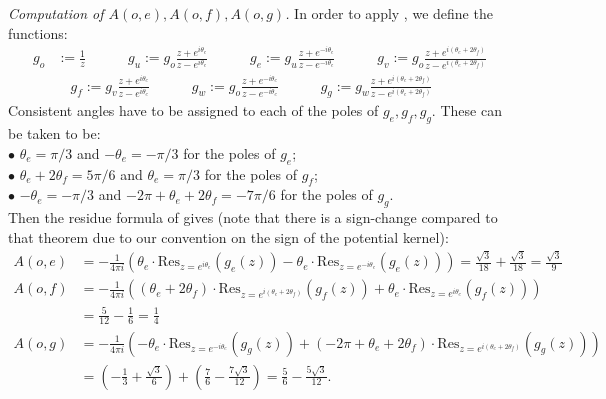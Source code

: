 \documentclass[11pt]{article}
\theoremstyle{remark}
\begin{document}
\emph{Computation of $A(o,e), A(o,f), A(o,g)$.} 
In order to apply \cite[Theorem 7.1]{K02}, we define the functions:
\begin{align*} 
   g_o 
   &:= \frac{1}{z} \qquad\quad 
   g_u 
   := g_o \frac{z+ e^{i \theta_e}}{z- e^{i \theta_e}} \qquad\quad
   g_e 
   := g_u \frac{z+ e^{-i \theta_e}}{z- e^{-i \theta_e}} \qquad\quad
   g_v 
   := g_o \frac{z+ e^{i (\theta_e+2 \theta_f)}}{z- e^{i (\theta_e+2\theta_f)}} \\ 
   &\quad
   g_f
   := g_v \frac{z+ e^{i \theta_e}}{z- e^{i \theta_e}} \qquad\quad
   g_w 
   := g_o \frac{z+ e^{-i \theta_e}}{z- e^{-i \theta_e}} \qquad\quad
   g_g 
   := g_w \frac{z+ e^{i (\theta_e+2\theta_f)}}{z- e^{i (\theta_e+2\theta_f)}}
\end{align*}
Consistent angles have to be assigned to each of the poles of $g_e, g_f, g_g$. 
These can be taken to be: \\
$\bullet$ $\theta_e = \pi/3$ and $-\theta_e = -\pi/3$ for the poles of $g_e$; \\
$\bullet$ $\theta_e + 2 \theta_f = 5\pi/6$ and $\theta_e = \pi/3$ for the poles of $g_f$; \\
$\bullet$ $-\theta_e = -\pi/3$ and $-2 \pi + \theta_e + 2 \theta_f = -7\pi/6$ 
for the poles of $g_g$. \\
Then the residue formula of \cite[Theorem 7.1]{K02} gives (note that there is a sign-change
compared to that theorem due to our convention on the sign of the potential kernel):
\begin{align*} 
   A(o,e) 
   &= -\frac{1}{4 \pi i} \left( \theta_e \cdot \mathrm{Res}_{z = e^{i \theta_e}}(g_e(z))
      -\theta_e \cdot \mathrm{Res}_{z = e^{-i \theta_e}}(g_e(z)) \right)
   = \frac{\sqrt{3}}{18} + \frac{\sqrt{3}}{18}
   = \frac{\sqrt{3}}{9} \\
   A(o,f)
   &= -\frac{1}{4 \pi i} \left( (\theta_e + 2 \theta_f) \cdot 
     \mathrm{Res}_{z = e^{i (\theta_e+2\theta_f)}}(g_f(z))
     + \theta_e \cdot \mathrm{Res}_{z = e^{i \theta_e}}(g_f(z)) \right) \\
   &= \frac{5}{12} - \frac{1}{6}
   = \frac{1}{4} \\
   A(o,g)
   &= -\frac{1}{4 \pi i} \left( -\theta_e \cdot 
     \mathrm{Res}_{z = e^{-i \theta_e}}(g_g(z))
     + \left( - 2\pi + \theta_e + 2 \theta_f \right) \cdot 
     \mathrm{Res}_{z = e^{i (\theta_e + 2 \theta_f)}}(g_g(z)) \right) \\
   &= \left( -\frac{1}{3} + \frac{\sqrt{3}}{6} \right)
      + \left( \frac{7}{6} - \frac{7 \sqrt{3}}{12} \right) 
   = \frac{5}{6}-\frac{5 \sqrt{3}}{12}. 
\end{align*}
\end{document}
